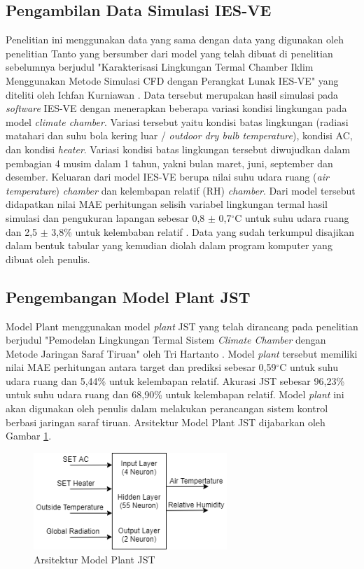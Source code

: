\subsection{Pengambilan Data Simulasi IES-VE}
Penelitian ini menggunakan data yang sama dengan data yang digunakan oleh penelitian Tanto \cite{skripsiTanto} yang bersumber dari model yang telah dibuat di penelitian sebelumnya berjudul "Karakterisasi Lingkungan Termal Chamber Iklim Menggunakan Metode Simulasi CFD dengan Perangkat Lunak IES-VE" yang diteliti oleh Ichfan Kurniawan \cite{skripsiIchfan}.  Data tersebut merupakan hasil simulasi pada \textit{software} IES-VE dengan menerapkan beberapa variasi kondisi lingkungan pada model \textit{climate chamber}. Variasi tersebut yaitu kondisi batas lingkungan (radiasi matahari dan suhu bola kering luar / \textit{outdoor dry bulb temperature}), kondisi AC, dan kondisi \textit{heater}. Variasi kondisi batas lingkungan tersebut diwujudkan dalam pembagian 4 musim dalam 1 tahun, yakni bulan maret, juni, september dan desember. Keluaran dari model IES-VE berupa nilai suhu udara ruang (\textit{air temperature}) \textit{chamber} dan kelembapan relatif (RH) \textit{chamber}. Dari model tersebut didapatkan nilai MAE perhitungan selisih variabel lingkungan termal hasil simulasi dan pengukuran lapangan sebesar 0,8 $\pm$ 0,7$^{\circ}$C untuk suhu udara ruang dan 2,5 $\pm$ 3,8\% untuk kelembaban relatif \cite{skripsiIchfan}. Data yang sudah terkumpul disajikan dalam bentuk tabular yang kemudian diolah dalam program komputer yang dibuat oleh penulis.

\subsection{Pengembangan Model Plant JST}
Model Plant menggunakan model \textit{plant} JST yang telah dirancang pada penelitian berjudul "Pemodelan Lingkungan Termal Sistem \textit{Climate Chamber} dengan Metode Jaringan Saraf Tiruan" oleh Tri Hartanto \cite{skripsiTanto}. Model \textit{plant} tersebut memiliki nilai MAE perhitungan antara target dan prediksi sebesar 0,59$^{\circ}$C untuk suhu udara ruang dan 5,44\% untuk kelembapan relatif. Akurasi JST sebesar 96,23\% untuk suhu udara ruang dan 68,90\% untuk kelembapan relatif\cite{skripsiTanto}. Model \textit{plant} ini akan digunakan oleh penulis dalam melakukan perancangan sistem kontrol berbasi jaringan saraf tiruan. Arsitektur Model Plant JST dijabarkan oleh Gambar \ref{fig:4:NNPlantModelDesign}.

\begin{figure}[!h]
	\centering
	\includegraphics[width=0.65\textwidth]{figures/NNPlantModelDesign}
	\caption{Arsitektur Model Plant JST}
	\label{fig:4:NNPlantModelDesign}
\end{figure}

